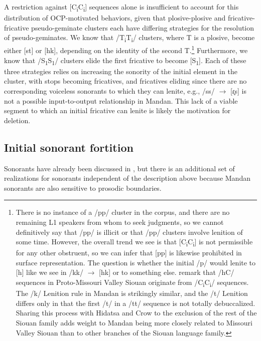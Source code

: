 A restriction against [C\textsubscript{i}C\textsubscript{i}] sequences alone is insufficient to account for this distribution of OCP-motivated behaviors, given that plosive-plosive and fricative-fricative pseudo-geminate clusters each have differing strategies for the resolution of pseudo-geminates. We know that /T\textsubscript{i}T\textsubscript{i}/ clusters, where T is a plosive, become either [st] or [hk], depending on the identity of the second T.\footnote{There is no instance of a /pp/ cluster in the corpus, and there are no remaining L1 speakers from whom to seek judgments, so we cannot definitively say that /pp/ is illicit or that /pp/ clusters involve lenition of  some time. However, the overall trend we see is that [C\textsubscript{i}C\textsubscript{i}] is not permissible for any other obstruent, so we can infer that [pp] is likewise prohibited in surface representation. The question is whether the initial /p/ would lenite to [h] like we see in /kk/ $\to$ [hk] or to something else. \citet{rankin2015} remark that /hC/ sequences in Proto-Missouri Valley Siouan originate from /C\textsubscript{i}C\textsubscript{i}/ sequences. The /k/ Lenition rule in Mandan is strikingly similar, and the /t/ Lenition differs only in that the first /t/ in a /tt/ sequence is not totally debuccalized. Sharing this process with Hidatsa and Crow to the exclusion of the rest of the Siouan family adds weight to Mandan being more closely related to Missouri Valley Siouan than to other branches of the Siouan language family.} Furthermore, we know that /S\textsubscript{1}S\textsubscript{1}/ clusters elide the first fricative to become [S\textsubscript{1}]. Each of these three strategies relies on increasing the sonority of the initial element in the cluster, with stops becoming fricatives, and fricatives eliding since there are no corresponding voiceless sonorants to which they can lenite, e.g., /ss/ $\to$ [ɾ̥s] is not a possible input-to-output relationship in Mandan. This lack of a viable segment to which an initial fricative can lenite is likely the motivation for deletion.

\subsection{Initial sonorant fortition}\label{sonorantfortition}

Sonorants have already been discussed in , but there is an additional set of realizations for sonorants independent of the description above because Mandan sonorants are also sensitive to prosodic boundaries.

